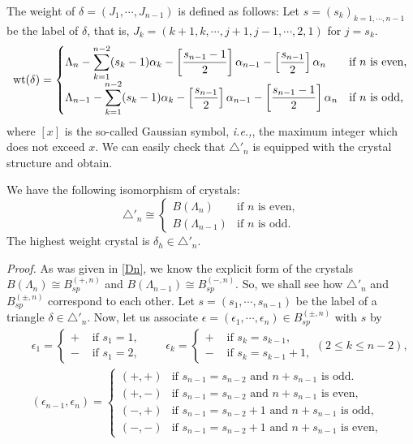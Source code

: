 The weight of ${\delta}=(J_1,{\cdots},J_{n-1})$ is defined as follows:
Let $s=(s_k)_{k=1,{\cdots},n-1}$ be the label of ${\delta}$, that is, 
$J_k=(k+1,k,{\cdots}, j+1,j-1,{\cdots},2,1)$ for $j=s_k$.
\begin{equation}
{{\rm wt}}({\delta})=\begin{cases}
\displaystyle
{\Lambda}_n-\sum_{k=1}^{n-2}(s_k-1){\alpha}_k-\left[\frac{s_{n-1}-1}{2}\right]
{\alpha}_{n-1}
-\left[\frac{s_{n-1}}{2}\right]{\alpha}_{n}&\text{if $n$ is even,}\\
\displaystyle
{\Lambda}_{n-1}-\sum_{k=1}^{n-2}(s_k-1){\alpha}_k-\left[\frac{s_{n-1}}{2}\right]
{\alpha}_{n-1}
-\left[\frac{s_{n-1}-1}{2}\right]{\alpha}_{n}&\text{if $n$ is odd,}
\end{cases}
\end{equation}
where $[x]$ is the so-called Gaussian symbol, {\it i.e.,}, the maximum
integer which does not exceed $x$.
We can easily check that ${\bigtriangleup}'_n$ is equipped with 
the crystal structure and obtain.
\begin{pro}\label{del-spin-d}
We have the following isomorphism of crystals:
\[
{\bigtriangleup}'_n\cong \begin{cases}B({\Lambda}_n)&\text{if $n$ is even,}\\
B({\Lambda}_{n-1})&\text{if $n$ is odd.}
\end{cases}
\]
The highest weight crystal is ${\delta}_h\in{\bigtriangleup}'_n$.
\end{pro}
{\sl Proof.}
As was given in \ref{Dn}, we know the explicit form of the crystals
$B({\Lambda}_n)\cong B^{(+,n)}_{sp}$ and $B({\Lambda}_{n-1})\cong B^{(-,n)}_{sp}$. 
So, we shall see how 
${\bigtriangleup}'_n$ and $B^{(\pm,n)}_{sp}$ correspond to each other.
Let $s=(s_1,{\cdots},s_{n-1})$ be the label of a triangle ${\delta}\in {\bigtriangleup}'_n$.
Now, let us associate ${\epsilon}=({\epsilon}_1,{\cdots},{\epsilon}_n)\in B^{(\pm,n)}_{sp}$ 
with $s$ by 
\begin{eqnarray}
&&{\epsilon}_1=\begin{cases}+&\text{ if }s_1=1,\\
-&\text{ if }s_1=2,
\end{cases}{\qquad}
{\epsilon}_k=\begin{cases}+&\text{ if }s_{k}=s_{k-1},\\
-&\text{ if }s_{k}=s_{k-1}+1,
\end{cases}(2\leq k\leq n-2),
\label{ep1-d}\\
&&
({\epsilon}_{n-1},{\epsilon}_n)=\begin{cases}
(+,+)&\text{if $s_{n-1}=s_{n-2}$ and $n+s_{n-1}$ is odd.}\\
(+,-)&\text{if $s_{n-1}=s_{n-2}$ and $n+s_{n-1}$ is even,}\\
(-,+)&\text{if $s_{n-1}=s_{n-2}+1$ and  $n+s_{n-1}$ is odd,}\\
(-,-)&\text{if $s_{n-1}=s_{n-2}+1$ and $n+s_{n-1}$ is even,}
\end{cases}
\label{ep2-d}
\end{eqnarray}
